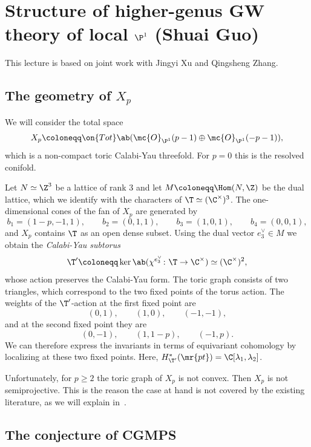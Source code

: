\section{\texorpdfstring{Structure of higher-genus GW theory of local \(\P^1\)}{Structure of higher-genus GW theory of local P1} (Shuai Guo)}%
\label{sec:Structure of higher-genus GW theory of local P1 (Shuai Guo)}

This lecture is based on joint work with Jingyi Xu and Qingsheng Zhang.

\subsection{The geometry of \(X_p\)}%
\label{sub:The geometry of Xp}

We will consider the total space
\[ X_p \coloneqq \on{Tot}\ab(\mc{O}_{\P^1}(p-1) \oplus \mc{O}_{\P^1}(-p-1)), \]
which is a non-compact toric Calabi-Yau threefold. For \(p = 0\) this is the resolved conifold.

Let \(N \simeq \Z^3\) be a lattice of rank \(3\) and let \(M \coloneqq \Hom(N,\Z)\) be the dual lattice, which we identify with the characters of \(\T \simeq (\C^{\times})^3\). The one-dimensional cones of the fan of \(X_p\) are generated by
\[ b_1 = (1-p,-1,1), \qquad b_2 = (0,1,1), \qquad b_3 = (1,0,1), \qquad b_4 = (0,0,1), \]
and \(X_p\) contains \(\T\) as an open dense subset. Using the dual vector \(e_3^{\vee} \in M\) we obtain the \textit{Calabi-Yau subtorus}
\[ \T' \coloneqq \ker\ab(\chi^{e_3^{\vee}} \colon \T \to \C^{\times}) \simeq (\C^{\times})^2, \]
whose action preserves the Calabi-Yau form. The toric graph consists of two triangles, which correspond to the two fixed points of the torus action. The weights of the \(\T'\)-action at the first fixed point are
\[ (0,1), \qquad (1,0), \qquad (-1,-1), \]
and at the second fixed point they are
\[ (0,-1), \qquad (1,1-p), \qquad (-1,p). \]
We can therefore express the invariants in terms of equivariant cohomology by localizing at these two fixed points. Here, \(H^*_{\T'}(\mr{pt}) = \C[\lambda_1,\lambda_2]\).

Unfortunately, for \(p \geq 2\) the toric graph of \(X_p\) is not convex. Then \(X_p\) is not semiprojective. This is the reason the case at hand is not covered by the existing literature, as we will explain in~.

\subsection{The conjecture of CGMPS}%
\label{sub:The conjecture of CGMPS}

